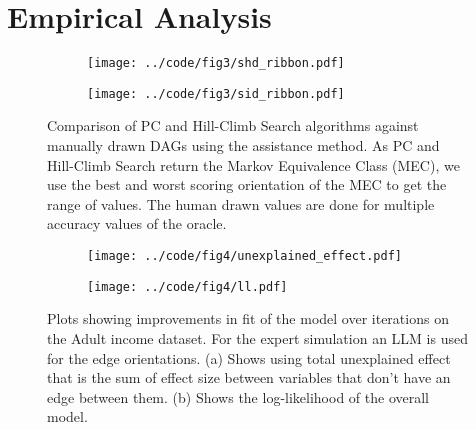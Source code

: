 \documentclass{uai2025} %
\begin{document}

\section{Empirical Analysis}
\label{sec:empirical}

\begin{figure}
	\begin{subfigure}{0.5\textwidth}
		\centering
		\texttt{[image: ../code/fig3/shd\_ribbon.pdf]}
		\caption{}
	\end{subfigure}
	\begin{subfigure}{0.5\textwidth}
		\centering
		\texttt{[image: ../code/fig3/sid\_ribbon.pdf]}
		\caption{}
	\end{subfigure}
	\caption{Comparison of PC and Hill-Climb Search algorithms against
		manually drawn DAGs using the assistance method. As PC and
		Hill-Climb Search return the Markov Equivalence Class (MEC), we
		use the best and worst scoring orientation of the MEC to get
		the range of values. The human drawn values are done for
		multiple accuracy values of the oracle.}
\end{figure}

\begin{figure}
	\begin{subfigure}{0.5\textwidth}
		\centering
		\texttt{[image: ../code/fig4/unexplained\_effect.pdf]}
		\caption{}
	\end{subfigure}
	\begin{subfigure}{0.5\textwidth}
		\centering
		\texttt{[image: ../code/fig4/ll.pdf]}
		\caption{}
	\end{subfigure}
	\caption{Plots showing improvements in fit of the model over iterations
	on the Adult income dataset. For the expert simulation an LLM is used
	for the edge orientations. (a) Shows using total unexplained effect that is the
	sum of effect size between variables that don't have an edge between them. (b)
	Shows the log-likelihood of the overall model.
	}
\end{figure}
\end{document}
